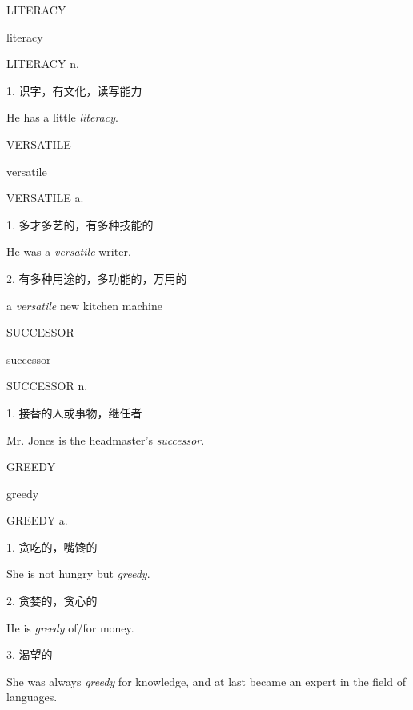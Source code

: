 \begin{flashcard}{
LITERACY

literacy
}
\begin{center}
LITERACY n. 
\end{center}
1. 识字，有文化，读写能力

He has a little \textit{literacy}.

\end{flashcard}
\begin{flashcard}{
VERSATILE

versatile
}
\begin{center}
VERSATILE a. 
\end{center}
1. 多才多艺的，有多种技能的

He was a \textit{versatile} writer.

2. 有多种用途的，多功能的，万用的

a \textit{versatile} new kitchen machine

\end{flashcard}
\begin{flashcard}{
SUCCESSOR

successor
}
\begin{center}
SUCCESSOR n. 
\end{center}
1. 接替的人或事物，继任者

Mr. Jones is the headmaster's \textit{successor}.

\end{flashcard}
\begin{flashcard}{
GREEDY

greedy
}
\begin{center}
GREEDY a. 
\end{center}
1. 贪吃的，嘴馋的

She is not hungry but \textit{greedy}.

2. 贪婪的，贪心的

He is \textit{greedy} of/for money.

3. 渴望的

She was always \textit{greedy} for knowledge, and at last became an expert in the field of languages.

\end{flashcard}
